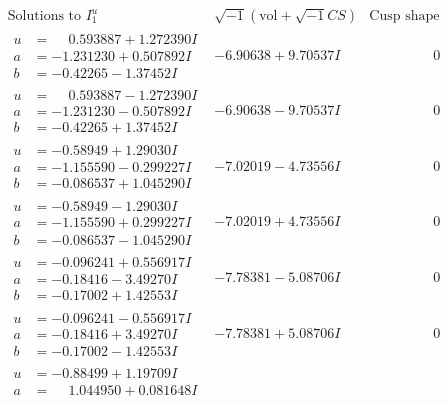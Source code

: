 \documentclass[1p]{elsarticle_modified}
\theoremstyle{definition}
\newcommand{\I}{\sqrt{-1}}
\begin{document}
$$\begin{array}{c|c|c}
\text{Solutions to }I^u_{1}& \I (\text{vol} + \sqrt{-1}CS) & \text{Cusp shape}\\
 \hline 
\begin{aligned}
u &= \phantom{-}0.593887 + 1.272390 I \\
a &= -1.231230 + 0.507892 I \\
b &= -0.42265 - 1.37452 I\end{aligned}
 & -6.90638 + 9.70537 I & \phantom{-0.000000 } 0 \\ \hline\begin{aligned}
u &= \phantom{-}0.593887 - 1.272390 I \\
a &= -1.231230 - 0.507892 I \\
b &= -0.42265 + 1.37452 I\end{aligned}
 & -6.90638 - 9.70537 I & \phantom{-0.000000 } 0 \\ \hline\begin{aligned}
u &= -0.58949 + 1.29030 I \\
a &= -1.155590 - 0.299227 I \\
b &= -0.086537 + 1.045290 I\end{aligned}
 & -7.02019 - 4.73556 I & \phantom{-0.000000 } 0 \\ \hline\begin{aligned}
u &= -0.58949 - 1.29030 I \\
a &= -1.155590 + 0.299227 I \\
b &= -0.086537 - 1.045290 I\end{aligned}
 & -7.02019 + 4.73556 I & \phantom{-0.000000 } 0 \\ \hline\begin{aligned}
u &= -0.096241 + 0.556917 I \\
a &= -0.18416 - 3.49270 I \\
b &= -0.17002 + 1.42553 I\end{aligned}
 & -7.78381 - 5.08706 I & \phantom{-0.000000 } 0 \\ \hline\begin{aligned}
u &= -0.096241 - 0.556917 I \\
a &= -0.18416 + 3.49270 I \\
b &= -0.17002 - 1.42553 I\end{aligned}
 & -7.78381 + 5.08706 I & \phantom{-0.000000 } 0 \\ \hline\begin{aligned}
u &= -0.88499 + 1.19709 I \\
a &= \phantom{-}1.044950 + 0.081648 I \\

\end{aligned}
\end{array}$$
\end{document}
